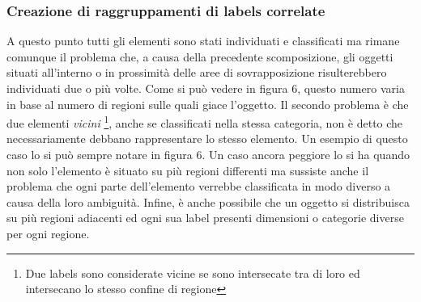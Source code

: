 \subsubsection{Creazione di raggruppamenti di labels correlate} 
A questo punto tutti gli elementi sono stati individuati e classificati ma rimane comunque il problema che, a causa della precedente scomposizione, gli oggetti situati all'interno o in prossimità delle aree di sovrapposizione risulterebbero individuati due o più volte. Come si può vedere in figura 6, questo numero varia in base al numero di regioni sulle quali giace l'oggetto. Il secondo problema è che due elementi \textit{vicini} \footnote{Due labels sono considerate vicine se sono intersecate tra di loro ed intersecano lo stesso confine di regione}, anche se classificati nella stessa categoria, non è detto che necessariamente debbano rappresentare lo stesso elemento. Un esempio di questo caso lo si può sempre notare in figura 6. Un caso ancora peggiore lo si ha quando non solo l'elemento è situato su più regioni differenti ma sussiste anche il problema che ogni parte dell'elemento verrebbe classificata in modo diverso a causa della loro ambiguità. Infine, è anche possibile che un oggetto si distribuisca su più regioni adiacenti ed ogni sua label presenti dimensioni o categorie diverse per ogni regione.
